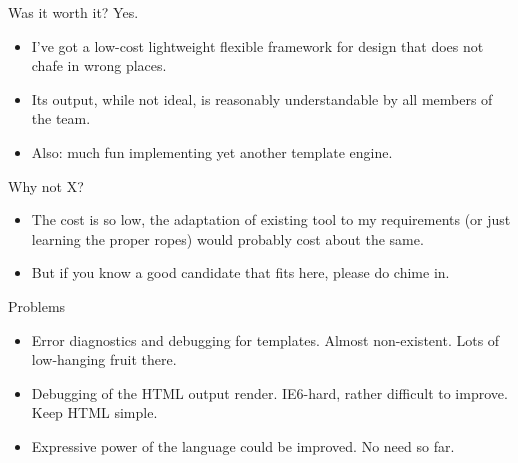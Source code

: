 \documentclass[aspectratio=43,handout,bigger]{beamer}
\begin{document}
\begin{frame}{Was it worth it?}
  Yes.
  \begin{itemize}
    \item I've got a low-cost lightweight flexible framework
          for design that does not chafe in wrong places.
    \item Its output, while not ideal, is reasonably understandable
          by all members of the team.
    \item Also: much fun implementing yet another template engine.
  \end{itemize}
\end{frame}


\begin{frame}{Why not X?}
  \begin{itemize}
    \item The cost is so low, the adaptation of existing tool to my requirements
          (or just learning the proper ropes) would probably cost
          about the same.
    \item But if you know a good candidate that fits here, please do chime in.
  \end{itemize}
\end{frame}


\begin{frame}{Problems}
  \begin{itemize}
    \item Error diagnostics and debugging for templates.
          Almost non-existent. Lots of low-hanging fruit there.
    \item Debugging of the HTML output render. IE6-hard,
          rather difficult to improve. Keep HTML simple.
    \item Expressive power of the language could be improved.
          No need so far.
  \end{itemize}
\end{frame}



\end{document}
